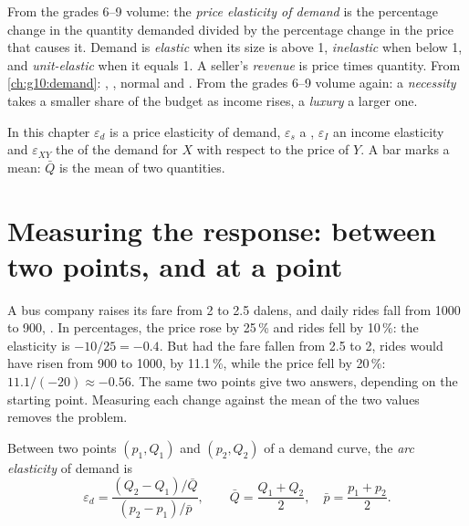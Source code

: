 \begin{recall}
From the grades 6--9 volume: the \emph{price elasticity of demand} is the percentage change in the quantity demanded divided by the
percentage change in the price that causes it. Demand is \emph{elastic} when its size is above 1, \emph{inelastic} when below 1, and
\emph{unit-elastic} when it equals 1. A seller's \emph{revenue} is price times quantity. From \cref{ch:g10:demand}: ,
, normal and . From the grades 6--9 volume
again: a \emph{necessity} takes a smaller share of the budget as income rises, a \emph{luxury} a larger one.
\end{recall}

\begin{notation}
In this chapter $\varepsilon_d$ is a price elasticity of demand, $\varepsilon_s$ a , $\varepsilon_I$ an
income elasticity and $\varepsilon_{XY}$ the  of the demand for $X$ with respect to the price of $Y$. A bar marks a
mean: $\bar Q$ is the mean of two quantities.
\end{notation}

\section{Measuring the response: between two points, and at a point}\label{sec:g10:elasticities:measure}

A bus company raises its fare from 2 to 2.5 dalens, and daily rides fall from \num{1000} to 900, . In percentages,
the price rose by 25\,\% and rides fell by 10\,\%: the elasticity is $-10/25 = -0.4$. But had the fare fallen from 2.5 to 2, rides would
have risen from 900 to \num{1000}, by 11.1\,\%, while the price fell by 20\,\%: $11.1/(-20) \approx -0.56$. The same two points give two
answers, depending on the starting point. Measuring each change against the mean of the two values removes the problem.

\begin{definition}\label{def:g10:elasticities:arc}
Between two points $(p_1, Q_1)$ and $(p_2, Q_2)$ of a demand curve, the \emph{arc elasticity} of demand is
\[
  \varepsilon_d = \frac{(Q_2 - Q_1)/\bar Q}{(p_2 - p_1)/\bar p}, \qquad \bar Q = \frac{Q_1 + Q_2}{2}, \quad \bar p = \frac{p_1 + p_2}{2}.
\]
\end{definition}

